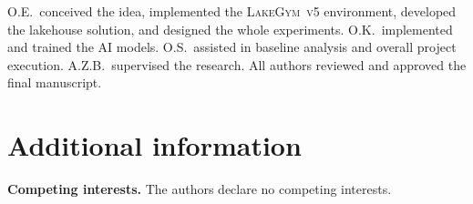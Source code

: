 \documentclass[fleqn,10pt]{wlscirep}
\newcommand{\env}{\textsc{LakeGym~v5}}
\begin{document}
O.E.\ conceived the idea, implemented the \env{} environment,
developed the lakehouse solution, and designed the whole experiments.
O.K.\ implemented and trained the AI models.
O.S.\ assisted in baseline analysis and overall project execution.
A.Z.B.\ supervised the research.
All authors reviewed and approved the final manuscript.

\section*{Additional information}

\textbf{Competing interests.} The authors declare no competing interests.
\end{document}
